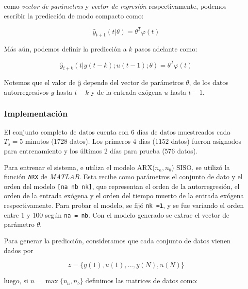 como \emph{vector de parámetros} y \emph{vector de regresión} respectivamente, podemos escribir la predicción de modo compacto como:

\begin{equation}
	\hat{y}_{t+1}(t | \theta) = \theta^T \varphi(t)
\end{equation}

Más aún, podemos definir la predicción a $k$ pasos adelante como:

\begin{equation}
\hat{y}_{t+k}(t | y(t-k); u(t-1); \theta) = \theta^T \varphi(t)
\end{equation}

Notemos que el valor de $\hat{y}$ depende del vector de parámetros $\theta$, de los datos autorregresivos $y$ hasta $t-k$ y de la entrada exógena $u$ hasta $t-1$.

\subsubsection*{Implementación}

El conjunto completo de datos cuenta con 6 días de datos muestreados cada $T_s = 5$ minutos ($1728$ datos). Los primeros 4 días ($1152$ datos) fueron asignados para entrenamiento y los últimos 2 días para prueba ($576$ datos).


Para entrenar el sistema, e utiliza el modelo ARX($n_a, n_b$) SISO, se utilizó la función \verb|ARX| de \emph{MATLAB}. Esta recibe como parámetros el conjunto de dato y el orden del modelo \verb|[na nb nk]|, que representan el orden de la autorregresión, el orden de la entrada exógena y el orden del tiempo muerto de la entrada exógena respectivamente. Para probar el modelo, se fijó \verb|nk =1|, y se fue variando el orden entre 1 y 100 según \verb|na = nb|. Con el modelo generado se extrae el vector de parámetro $\theta$. 


Para generar la predicción, consideramos que cada conjunto de datos vienen dados por

\begin{equation}
	z = \{y(1), u(1), \dots , y(N), u(N) \}
\end{equation}

luego, si $n=\max\{n_a,n_b\}$ definimos las matrices de datos como:

